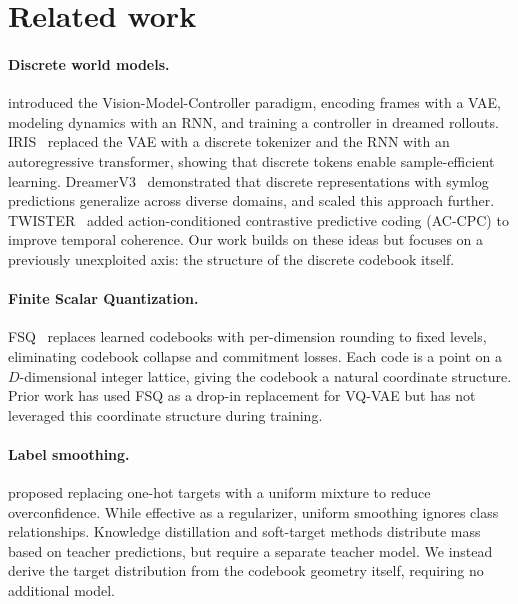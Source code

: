 \documentclass{article}
\begin{document}
\section{Related work}
\label{sec:related}

\paragraph{Discrete world models.}
\citet{ha2018world} introduced the Vision-Model-Controller paradigm, encoding frames with a VAE, modeling dynamics with an RNN, and training a controller in dreamed rollouts.
IRIS~\citep{micheli2023iris} replaced the VAE with a discrete tokenizer and the RNN with an autoregressive transformer, showing that discrete tokens enable sample-efficient learning.
DreamerV3~\citep{hafner2025dreamerv3} demonstrated that discrete representations with symlog predictions generalize across diverse domains, and \citet{hafner2025dreamer4} scaled this approach further.
TWISTER~\citep{burchi2025twister} added action-conditioned contrastive predictive coding (AC-CPC) to improve temporal coherence.
Our work builds on these ideas but focuses on a previously unexploited axis: the structure of the discrete codebook itself.

\paragraph{Finite Scalar Quantization.}
FSQ~\citep{mentzer2024fsq} replaces learned codebooks with per-dimension rounding to fixed levels, eliminating codebook collapse and commitment losses.
Each code is a point on a $D$-dimensional integer lattice, giving the codebook a natural coordinate structure.
Prior work has used FSQ as a drop-in replacement for VQ-VAE but has not leveraged this coordinate structure during training.

\paragraph{Label smoothing.}
\citet{szegedy2016rethinking} proposed replacing one-hot targets with a uniform mixture to reduce overconfidence.
While effective as a regularizer, uniform smoothing ignores class relationships.
Knowledge distillation and soft-target methods distribute mass based on teacher predictions, but require a separate teacher model.
We instead derive the target distribution from the codebook geometry itself, requiring no additional model.
\end{document}
